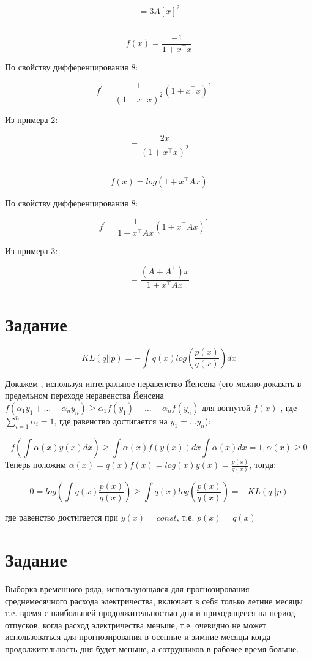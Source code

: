\documentclass[12pt,a4paper,oneside]{scrartcl}
\begin{document}
$$ = 3A[x]^2$$

\subsection{}

$$f(x) = \frac{-1}{1 + x^{\intercal}x}$$

По свойству дифференцирования 8:

$$f^{'} = \frac{1}{(1 + x^{\intercal}x)^2}(1 + x^{\intercal}x)^{'} = $$

Из примера 2:

$$ = \frac{2x}{(1 + x^{\intercal}x)^2}$$

\subsection{}

$$f(x) = log(1 + x^{\intercal}Ax)$$

По свойству дифференцирования 8:

$$f^{'} = \frac{1}{1 + x^{\intercal}Ax}(1 + x^{\intercal}Ax)^{'} = $$

Из примера 3:

$$ = \frac{(A + A^{\intercal})x}{1 + x^{\intercal}Ax}$$


\section{Задание}


$$KL(q||p) = - \int q(x)log(\frac{p(x)}{q(x)})dx$$

Докажем , используя интегральное неравенство Йенсена (его можно доказать в предельном переходе 
неравенства Йенсена $f(\alpha_1y_1 + \ldots + \alpha_ny_n) \geq \alpha_1f(y_1) + \ldots + \alpha_nf(y_n)$ для вогнутой $f(x)$ , где $\sum_{i=1}^n \alpha_i = 1$, где равенство достигается на $y_1 = \ldots y_n$):

$$f(\int \alpha(x)y(x)dx) \geq \int \alpha(x) f(y(x))dx \int \alpha(x)dx = 1, \alpha(x) \geq 0$$
Теперь положим $\alpha(x) = q(x) f(x) = log(x) y(x) = \frac{p(x)}{q(x)}$, тогда:

$$ 0 = log(\int q(x) \frac{p(x)}{q(x)}) \geq \int q(x) log(\frac{p(x)}{q(x)}) = - KL(q||p)$$

где равенство достигается при $y(x) = const$, т.е. $p(x) = q(x)$

\section{Задание}

Выборка временного ряда, использующаяся для прогнозирования среднемесячного расхода электричества, включает в себя только летние месяцы т.е. время с наибольшей продолжительностью дня и приходящееся на период отпусков, когда расход электричества меньше, т.е. очевидно не может использоваться для прогнозирования в осенние и зимние месяцы когда продолжительность дня будет меньше, а сотрудников в рабочее время больше. 
\end{document}
